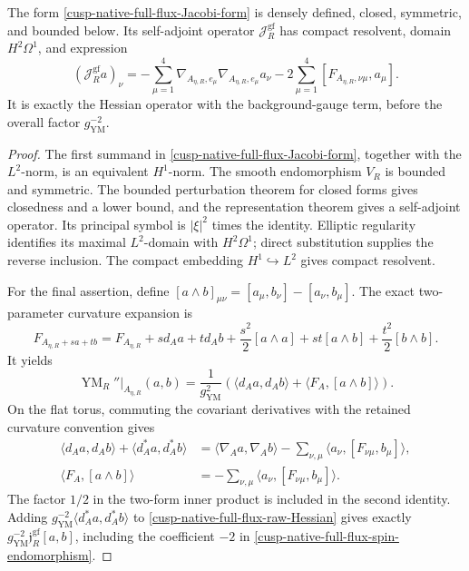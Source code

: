 \begin{proposition}
\label{cusp-native-full-flux-closed-Jacobi}
The form \cref{cusp-native-full-flux-Jacobi-form} is densely defined, closed,
symmetric, and bounded below.  Its self-adjoint operator
\(\mathcal J_R^{\mathrm{gf}}\) has compact resolvent, domain \(H^2\Omega^1\),
and expression
\begin{equation}
 (\mathcal J_R^{\mathrm{gf}}a)_\nu
 =-\sum_{\mu=1}^4
   \nabla_{A_{\eta,R},e_\mu}\nabla_{A_{\eta,R},e_\mu}a_\nu
  -2\sum_{\mu=1}^4[F_{A_{\eta,R},\nu\mu},a_\mu].
 \label{cusp-native-full-flux-Jacobi-expression}
\end{equation}
It is exactly the Hessian operator with the background-gauge term, before
the overall factor \(g_{\mathrm{YM}}^{-2}\).
\end{proposition}

\begin{proof}
The first summand in \cref{cusp-native-full-flux-Jacobi-form}, together with
the \(L^2\)-norm, is an equivalent \(H^1\)-norm.  The smooth endomorphism
\(V_R\) is bounded and symmetric.  The bounded perturbation theorem for
closed forms gives closedness and a lower bound, and the representation
theorem gives a self-adjoint operator.  Its principal symbol is
\(|\xi|^2\) times the identity.  Elliptic regularity identifies its maximal
\(L^2\)-domain with \(H^2\Omega^1\); direct substitution supplies the reverse
inclusion.  The compact embedding \(H^1\hookrightarrow L^2\) gives compact
resolvent.

For the final assertion, define
\([a\wedge b]_{\mu\nu}=[a_\mu,b_\nu]-[a_\nu,b_\mu]\).  The exact
two-parameter curvature expansion is
\[
 F_{A_{\eta,R}+sa+tb}=F_{A_{\eta,R}}+s d_Aa+t d_Ab
 +\frac{s^2}{2}[a\wedge a]+st[a\wedge b]
 +\frac{t^2}{2}[b\wedge b].
\]
It yields
\begin{equation}
 \operatorname{YM}_R''\big|_{A_{\eta,R}}(a,b)
 =\frac1{g_{\mathrm{YM}}^2}
 \left(\langle d_Aa,d_Ab\rangle
 +\langle F_A,[a\wedge b]\rangle\right).
 \label{cusp-native-full-flux-raw-Hessian}
\end{equation}
On the flat torus, commuting the covariant derivatives with the retained
curvature convention gives
\begin{align*}
 \langle d_Aa,d_Ab\rangle+\langle d_A^*a,d_A^*b\rangle
 &=\langle\nabla_Aa,\nabla_Ab\rangle
 -\sum_{\nu,\mu}\langle a_\nu,[F_{\nu\mu},b_\mu]\rangle,\\
 \langle F_A,[a\wedge b]\rangle
 &=-\sum_{\nu,\mu}\langle a_\nu,[F_{\nu\mu},b_\mu]\rangle.
\end{align*}
The factor \(1/2\) in the two-form inner product is included in the second
identity.  Adding
\(g_{\mathrm{YM}}^{-2}\langle d_A^*a,d_A^*b\rangle\) to
\cref{cusp-native-full-flux-raw-Hessian} gives exactly
\(g_{\mathrm{YM}}^{-2}\mathfrak j_R^{\mathrm{gf}}[a,b]\), including the
coefficient \(-2\) in \cref{cusp-native-full-flux-spin-endomorphism}.
\end{proof}

